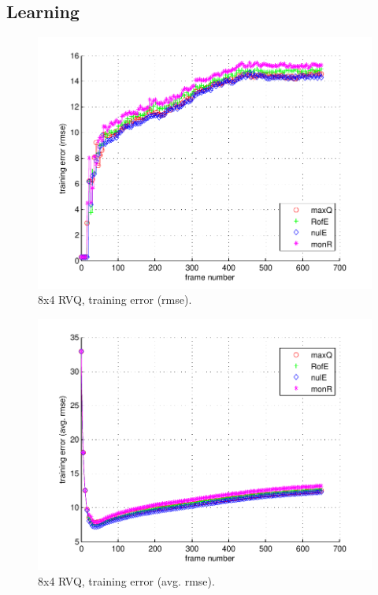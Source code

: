 \subsection{Learning}

								\begin{figure}[h!]
								\centering
								\includegraphics[height=0.4\textheight]{thesis/6_car4_8_4_1000_trg_rmse.pdf}
								\caption{8x4 RVQ, training error (rmse).}
								\label{fig:6_car4_8_4_1000_trg_rmse}
								\end{figure}


								\begin{figure}[h!]
								\centering
								\includegraphics[height=0.4\textheight]{thesis/6_car4_8_4_1000_trg_armse.pdf}
								\caption{8x4 RVQ, training error (avg. rmse).}
								\label{fig:6_car4_8_4_1000_trg_armse}
								\end{figure}

